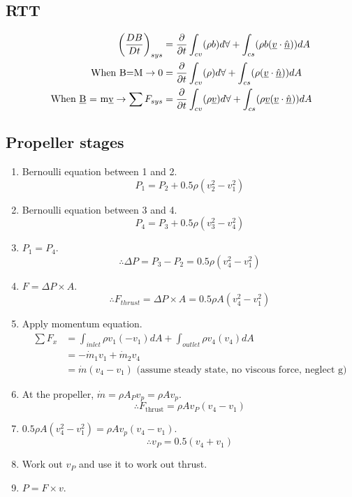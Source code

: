 \documentclass[class=report, crop=false, 12pt,a4paper]{standalone}
\begin{document}
\subsection{RTT}
\begin{align*}
  \left( \frac{DB}{Dt} \right)_{sys} &= \frac{\partial}{\partial t}\int_{cv}(\rho b) d\forall + \int_{cs} (\rho b(\underline{v} \cdot \underline{\hat{n}})) dA\\
  \textrm{When B=M} \rightarrow 0 &= \frac{\partial}{\partial t}\int_{cv}(\rho) d\forall + \int_{cs} (\rho(\underline{v} \cdot \underline{\hat{n}})) dA\\
  \textrm{When \underline{B} = m\underline{v}} \rightarrow \sum F_{sys} &= \frac{\partial}{\partial t}\int_{cv}(\rho \underline{v}) d\forall + \int_{cs} (\rho \underline{v} (\underline{v} \cdot \underline{\hat{n}})) dA\\
\end{align*}
\subsection{Propeller stages}
\begin{enumerate}
  \item Bernoulli equation between 1 and 2. \[ P_1 = P_2 +0.5\rho (v_2^2 - v_1^2) \]
  \item Bernoulli equation between 3 and 4. \[ P_4 = P_3 +0.5\rho (v_3^2 - v_4^2) \]
  \item \( P_1 = P_4 \). \[ \therefore \Delta P = P_3 - P_2 = 0.5 \rho (v_4^2 - v_1^2) \]
  \item \( F=\Delta P \times A \). \[ \therefore F_{thrust} = \Delta P \times A = 0.5 \rho A (v_4^2 - v_1^2) \]
  \item Apply momentum equation.
    \begin{align*}
      \sum F_x &= \int_{inlet}\rho v_1 (-v_1)dA + \int_{outlet}\rho v_4 (v_4)dA\\
      &= -\dot{m}_1 v_1 + \dot{m}_2 v_4\\
      &= \dot{m}(v_4 - v_1) \textrm{ (assume steady state, no viscous force, neglect g)}
    \end{align*}
  \item At the propeller, \( \dot{m} = \rho A_P v_p = \rho A v_p \). \[ \therefore F_{\textrm{thrust}} = \rho A v_P(v_4 - v_1) \]
  \item \( 0.5 \rho A (v_4^2 - v_1^2) = \rho A v_p (v_4 - v_1) \). \[ \therefore v_P = 0.5 (v_4 + v_1) \]
  \item Work out \(v_P\) and use it to work out thrust.
  \item \( P = F \times v \).
\end{enumerate}
\end{document}
